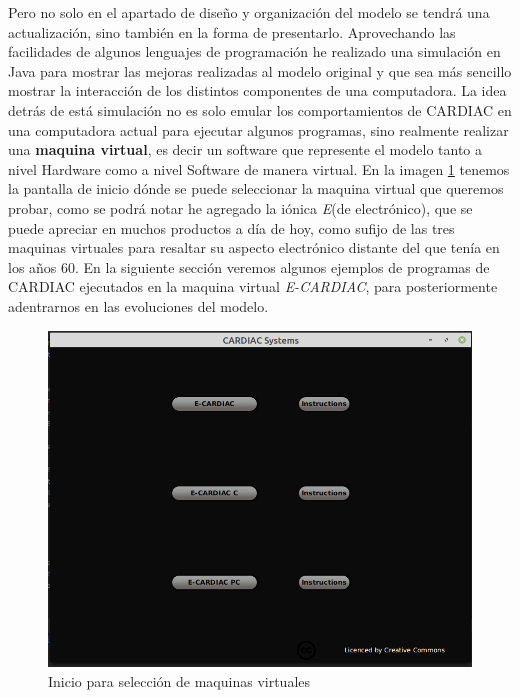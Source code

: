 \documentclass[letterpaper,12pt,oneside]{book}
\begin{document}
	Pero no solo en el apartado de diseño y organización del modelo se tendrá una actualización, sino también en la forma de presentarlo. Aprovechando
	las facilidades de algunos lenguajes de programación he realizado una simulación en Java para mostrar las mejoras realizadas al modelo
	original y que sea más sencillo mostrar la interacción de los distintos componentes de una computadora. La idea detrás de está simulación
	no es solo emular los comportamientos de CARDIAC en una computadora actual para ejecutar algunos programas,
	sino realmente realizar una \textbf{maquina virtual}, es decir un software que represente
	el modelo tanto a nivel Hardware como a nivel Software de manera virtual. En la imagen \ref{fig:welcomeec} tenemos la pantalla de inicio
	dónde se puede seleccionar la maquina virtual que queremos probar, como se podrá notar he agregado la iónica \textit{E}(de electrónico), que
	se puede apreciar en muchos productos a día de hoy, como sufijo de las tres maquinas virtuales para resaltar su aspecto
	electrónico distante del que tenía en los años 60. En la siguiente sección veremos algunos ejemplos de 
	programas
	de CARDIAC ejecutados en la maquina virtual \textit{E-CARDIAC}, para posteriormente adentrarnos en las evoluciones del modelo.

	
	\begin{figure}[h]
 			\centering
			\includegraphics[scale=0.5]{media/CARDIACC/WelcomeEC.png}
			\caption{Inicio para selección de maquinas virtuales}
			\label{fig:welcomeec}
	\end{figure}
\end{document}
